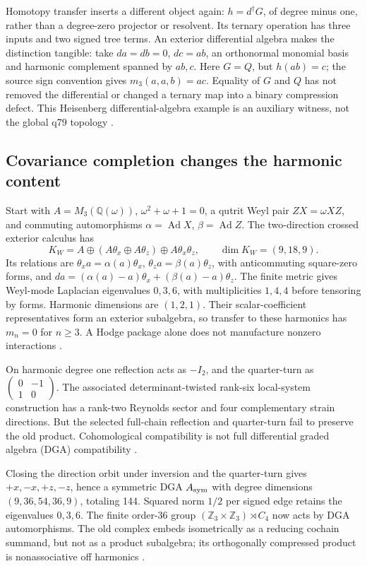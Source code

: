 \documentclass[11pt,a4paper]{article}
\begin{document}
Homotopy transfer inserts a different object again: \(h=d^\dagger G\),
of degree minus one, rather than a degree-zero projector or resolvent.
Its ternary operation has three inputs and two signed tree terms.
An exterior differential algebra makes the distinction tangible: take
\(da=db=0\), \(dc=ab\), an orthonormal monomial basis and harmonic
complement spanned by \(ab,c\). Here \(G=Q\), but \(h(ab)=c\);
the source sign convention gives \(m_3(a,a,b)=ac\). Equality of \(G\)
and \(Q\) has not removed the differential or changed a ternary map into
a binary compression defect. This Heisenberg differential-algebra example
is an auxiliary witness, not the global q79 topology
\cite{CBFTransferComparison2026}.

\subsection{Covariance completion changes the harmonic content}
\label{sec:finite-weyl-completion}
Start with \(A=M_3(\mathbb Q(\omega))\), \(\omega^2+\omega+1=0\),
a qutrit Weyl pair \(ZX=\omega XZ\), and commuting automorphisms
\(\alpha=\operatorname{Ad}X\), \(\beta=\operatorname{Ad}Z\).
The two-direction crossed exterior calculus has
\[
 K_W=A\oplus(A\theta_x\oplus A\theta_z)\oplus A\theta_x\theta_z,
 \qquad\dim K_W=(9,18,9).
\]
Its relations are \(\theta_xa=\alpha(a)\theta_x\),
\(\theta_za=\beta(a)\theta_z\), with anticommuting square-zero forms,
and \(da=(\alpha(a)-a)\theta_x+(\beta(a)-a)\theta_z\).
The finite metric gives Weyl-mode Laplacian eigenvalues \(0,3,6\),
with multiplicities \(1,4,4\) before tensoring by forms. Harmonic
dimensions are \((1,2,1)\). Their scalar-coefficient representatives form
an exterior subalgebra, so transfer to these harmonics has \(m_n=0\)
for \(n\geq3\). A Hodge package alone does not manufacture nonzero
interactions \cite{CBFWeylHodge2026}.

On harmonic degree one reflection acts as \(-I_2\), and the quarter-turn
as \(\left(\begin{smallmatrix}0&-1\\1&0\end{smallmatrix}\right)\).
The associated determinant-twisted rank-six local-system construction has
a rank-two Reynolds sector and four complementary strain directions.
But the selected full-chain reflection and quarter-turn fail to preserve
the old product. Cohomological compatibility is not full differential
graded algebra (DGA) compatibility \cite{CBFWeylMonodromy2026}.

Closing the direction orbit under inversion and the quarter-turn gives
\(+x,-x,+z,-z\), hence a symmetric DGA \(A_{\rm sym}\) with degree
dimensions \((9,36,54,36,9)\), totaling 144. Squared norm \(1/2\) per
signed edge retains the eigenvalues \(0,3,6\). The finite order-36 group
\((\mathbb Z_3\times\mathbb Z_3)\rtimes C_4\) now acts by DGA
automorphisms. The old complex embeds isometrically as a reducing cochain
summand, but not as a product subalgebra; its orthogonally compressed
product is nonassociative off harmonics \cite{CBFSymmetricWeyl2026}.
\end{document}
